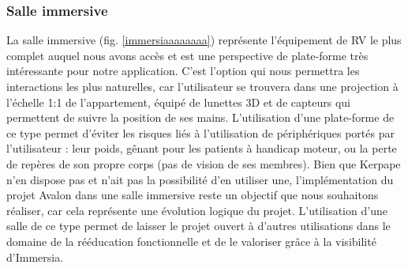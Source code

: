 \subsubsection{Salle immersive}
La salle immersive (fig. \ref{immersiaaaaaaaa}) représente l'équipement de RV le plus complet auquel nous avons accès et est une perspective de plate-forme très intéressante pour notre application.
C'est l'option qui nous permettra les interactions les plus naturelles, car l'utilisateur se trouvera dans une projection à l'échelle 1:1 de l'appartement, équipé de lunettes 3D et de capteurs qui permettent de suivre la position de ses mains. \newline
L'utilisation d'une plate-forme de ce type permet d'éviter les risques liés à l'utilisation de périphériques portés par l'utilisateur : leur poids, gênant pour les patients à handicap moteur, ou la perte de repères de son propre corps (pas de vision de ses membres).
Bien que Kerpape n'en dispose pas et n'ait pas la possibilité d'en utiliser une, l'implémentation du projet Avalon dans une salle immersive reste un objectif que nous souhaitons réaliser, car cela représente une évolution logique du projet.
L'utilisation d'une salle de ce type permet de laisser le projet ouvert à d'autres utilisations dans le domaine de la rééducation fonctionnelle et de le valoriser grâce à la visibilité d'Immersia.
